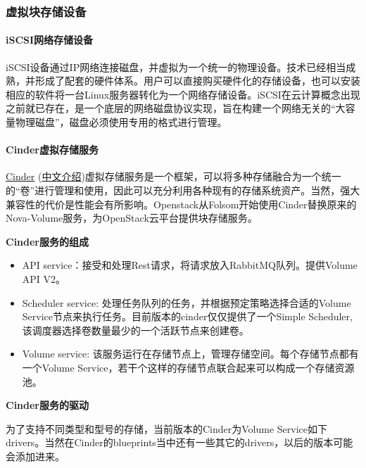 \documentclass[letterpaper,10pt,english]{sphinxmanual}
\begin{document}
\subsubsection{虚拟块存储设备}
\label{gispark_cloud:_u865a_u62df_u5757_u5b58_u50a8_u8bbe_u5907}

\paragraph{iSCSI网络存储设备}
\label{gispark_cloud:iSCSI_u7f51_u7edc_u5b58_u50a8_u8bbe_u5907}
iSCSI设备通过IP网络连接磁盘，并虚拟为一个统一的物理设备。技术已经相当成熟，并形成了配套的硬件体系。用户可以直接购买硬件化的存储设备，也可以安装相应的软件将一台Linux服务器转化为一个网络存储设备。iSCSI在云计算概念出现之前就已存在，是一个底层的网络磁盘协议实现，旨在构建一个网络无关的“大容量物理磁盘”，磁盘必须使用专用的格式进行管理。


\paragraph{Cinder虚拟存储服务}
\label{gispark_cloud:Cinder_u865a_u62df_u5b58_u50a8_u670d_u52a1}
\href{https://wiki.openstack.org/wiki/Cinder}{Cinder}
(\href{http://www.oschina.net/p/openstack-cinder}{中文介绍})虚拟存储服务是一个框架，可以将多种存储融合为一个统一的“卷”进行管理和使用，因此可以充分利用各种现有的存储系统资产。当然，强大兼容性的代价是性能会有所影响。Openstack从Folsom开始使用Cinder替换原来的Nova-Volume服务，为OpenStack云平台提供块存储服务。

\textbf{Cinder服务的组成}
\begin{itemize}
\item {} 
API service：接受和处理Rest请求，将请求放入RabbitMQ队列。提供Volume
API V2。

\item {} 
Scheduler service: 处理任务队列的任务，并根据预定策略选择合适的Volume
Service节点来执行任务。目前版本的cinder仅仅提供了一个Simple
Scheduler, 该调度器选择卷数量最少的一个活跃节点来创建卷。

\item {} 
Volume service:
该服务运行在存储节点上，管理存储空间。每个存储节点都有一个Volume
Service，若干个这样的存储节点联合起来可以构成一个存储资源池。

\end{itemize}

\textbf{Cinder服务的驱动}

为了支持不同类型和型号的存储，当前版本的Cinder为Volume
Service如下drivers。当然在Cinder的blueprints当中还有一些其它的drivers，以后的版本可能会添加进来。
\end{document}
